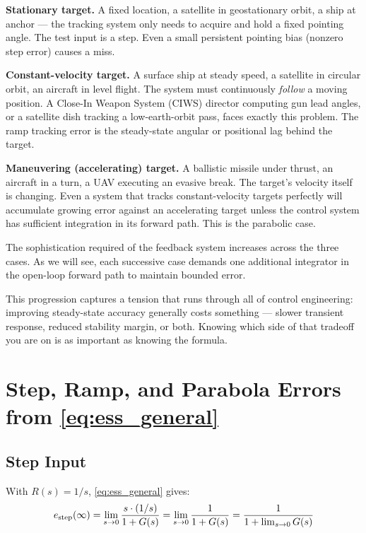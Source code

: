\documentclass[12pt]{article}
\begin{document}
\textbf{Stationary target.}  A fixed location, a satellite in geostationary
orbit, a ship at anchor --- the tracking system only needs to acquire and hold a
fixed pointing angle.  The test input is a step.  Even a small persistent pointing
bias (nonzero step error) causes a miss.

\textbf{Constant-velocity target.}  A surface ship at steady speed, a satellite
in circular orbit, an aircraft in level flight.  The system must continuously
\emph{follow} a moving position.  A Close-In Weapon System (CIWS) director
computing gun lead angles, or a satellite dish tracking a low-earth-orbit pass,
faces exactly this problem.  The ramp tracking error is the steady-state angular
or positional lag behind the target.

\textbf{Maneuvering (accelerating) target.}  A ballistic missile under thrust,
an aircraft in a turn, a UAV executing an evasive break.  The target's
velocity itself is changing.  Even a system that tracks constant-velocity targets
perfectly will accumulate growing error against an accelerating target unless the
control system has sufficient integration in its forward path.  This is the
parabolic case.

The sophistication required of the feedback system increases across the three
cases.  As we will see, each successive case demands one additional integrator
in the open-loop forward path to maintain bounded error.

This progression captures a tension that runs through all of control engineering:
improving steady-state accuracy generally costs something --- slower transient
response, reduced stability margin, or both.  Knowing which side of that
tradeoff you are on is as important as knowing the formula.

\section{Step, Ramp, and Parabola Errors from \cref{eq:ess_general}}
\label{sec:three_cases}

\subsection{Step Input}

With $R(s) = 1/s$, \cref{eq:ess_general} gives:
\begin{equation}
  e_{\rm step}(\infty)
    = \lim_{s \to 0} \frac{s \cdot (1/s)}{1 + G(s)}
    = \lim_{s \to 0} \frac{1}{1 + G(s)}
    = \frac{1}{1 + \lim_{s\to 0} G(s)}
  \label{eq:ess_step}
\end{equation}
\end{document}
